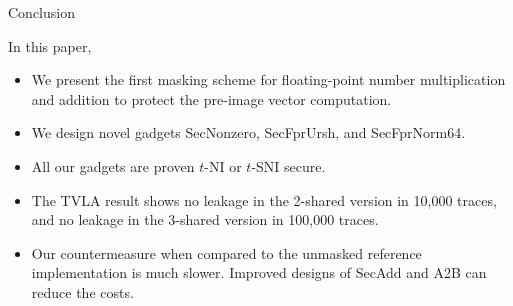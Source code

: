 \begin{frame}{Conclusion}

In this paper,
\pause
\begin{itemize}
	\item We present the first masking scheme for floating-point number multiplication and addition to protect the pre-image vector computation.
	\pause
	\item We design novel gadgets {\sf SecNonzero}, {\sf SecFprUrsh}, and {\sf SecFprNorm64}.
	\pause
	\item All our gadgets are proven $t$-NI or $t$-SNI secure.
	\pause
	\item The TVLA result shows no leakage in the 2-shared version in 10,000 traces, and no leakage in the 3-shared version in 100,000 traces.
	\pause
	\item Our countermeasure when compared to the unmasked reference implementation is much slower. Improved designs of {\sf SecAdd} and {\sf A2B} can reduce the costs.
\end{itemize}


\end{frame}